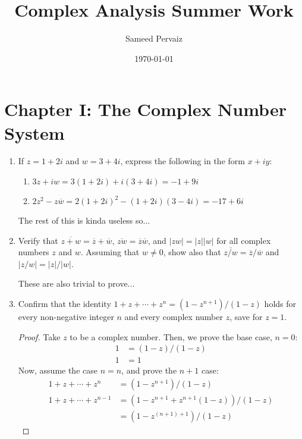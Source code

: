 \documentclass[12pt,a4paper]{article}
\title{Complex Analysis Summer Work}
\author{Sameed Pervaiz}
\date{\today}
\begin{document}
\maketitle

\section*{Chapter I: The Complex Number System}

\begin{enumerate}[label={\bfseries I.4.\arabic*}]
	\item If $z=1+2i$ and $w=3+4i$, express the following in the form $x+iy$:
	\begin{enumerate}
		\item $3z+iw = 3(1+2i) + i(3+4i) = -1 + 9i$ \\
		\item $2z^2-z\overline{w} = 2(1+2i)^2 - (1+2i)(3-4i) = -17 + 6i$ \\
	\end{enumerate}
	
	The rest of this is kinda useless so...


	\item Verify that $\overline{z+w} = \overline{z} + \overline{w}$, $\overline{zw} =
	\overline{z}\overline{w}$, and $|zw|=|z||w|$ for all complex numbers $z$ and $w$. Assuming that
	$w \neq 0$, show also that $\overline{z/w}=\overline{z}/\overline{w}$ and $|z/w|=|z|/|w|$.

	These are also trivial to prove...

	\item Confirm that the identity $1+z+\cdots+z^n = (1-z^{n+1})/(1-z)$ holds for every non-negative
	integer $n$ and every complex number $z$, save for $z=1$.

	\begin{proof}
		Take $z$ to be a complex number. Then, we prove the base case, $n=0:$
		\begin{align}
			1 &= (1-z)/(1-z) \\
			1 &= 1
		\end{align}
		Now, assume the case $n=n$, and prove the $n+1$ case:
		\begin{align}
			1 + z + \cdots + z^n &= (1-z^{n+1})/(1-z) \\
			1 + z + \cdots + z^{n-1} &= (1-z^{n+1} + z^{n+1}(1-z))/(1-z) \\
			&= (1-z^{(n+1)+1})/(1-z)
		\end{align}
	\end{proof}


\end{enumerate}
\end{document}
